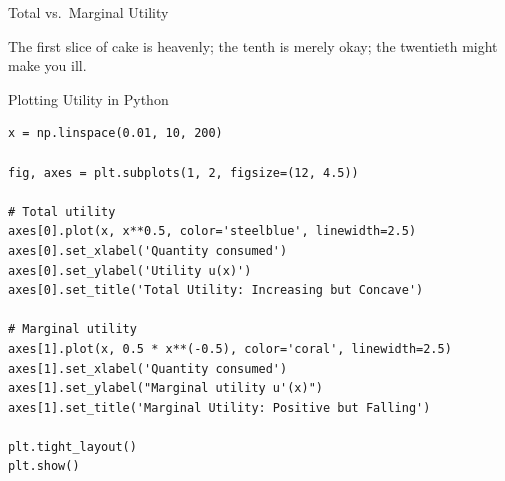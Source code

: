 \documentclass[aspectratio=169, 10pt]{beamer}
\begin{document}
\begin{frame}{Total vs.\ Marginal Utility}
\begin{center}
\end{center}
\vspace{0.3em}
The first slice of cake is heavenly; the tenth is merely okay;
the twentieth might make you ill.
\end{frame}

\begin{frame}[fragile]{Plotting Utility in Python}
\begin{lstlisting}
x = np.linspace(0.01, 10, 200)

fig, axes = plt.subplots(1, 2, figsize=(12, 4.5))

# Total utility
axes[0].plot(x, x**0.5, color='steelblue', linewidth=2.5)
axes[0].set_xlabel('Quantity consumed')
axes[0].set_ylabel('Utility u(x)')
axes[0].set_title('Total Utility: Increasing but Concave')

# Marginal utility
axes[1].plot(x, 0.5 * x**(-0.5), color='coral', linewidth=2.5)
axes[1].set_xlabel('Quantity consumed')
axes[1].set_ylabel("Marginal utility u'(x)")
axes[1].set_title('Marginal Utility: Positive but Falling')

plt.tight_layout()
plt.show()
\end{lstlisting}
\end{frame}
\end{document}
